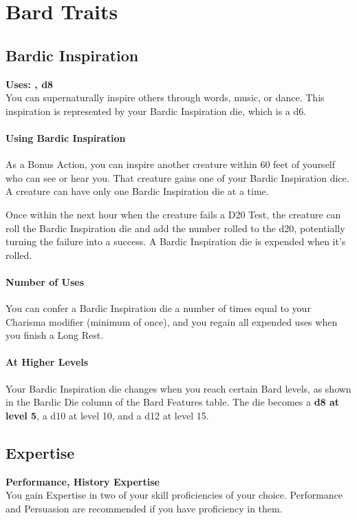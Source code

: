 \documentclass[letterpaper,openany,oneside,twocolumn]{book}
\begin{document}
\section*{Bard Traits}
\subsection*{Bardic Inspiration}
\textbf{Uses: , d8}\\
You can supernaturally inspire others through words, music, or dance. This inspiration is represented by your Bardic Inspiration die, which is a d6.

\paragraph*{Using Bardic Inspiration} As a Bonus Action, you can inspire another creature within 60 feet of yourself who can see or hear you. That creature gains one of your Bardic Inspiration dice. A creature can have only one Bardic Inspiration die at a time.

Once within the next hour when the creature fails a D20 Test, the creature can roll the Bardic Inspiration die and add the number rolled to the d20, potentially turning the failure into a success. A Bardic Inspiration die is expended when it's rolled.

\paragraph*{Number of Uses} You can confer a Bardic Inspiration die a number of times equal to your Charisma modifier (minimum of once), and you regain all expended uses when you finish a Long Rest.

\paragraph*{At Higher Levels} Your Bardic Inspiration die changes when you reach certain Bard levels, as shown in the Bardic Die column of the Bard Features table. The die becomes a \textbf{d8 at level 5}, a d10 at level 10, and a d12 at level 15.
\subsection*{Expertise}
\textbf{Performance, History Expertise}\\
You gain Expertise in two of your skill proficiencies of your choice. Performance and Persuasion are recommended if you have proficiency in them.
\end{document}
